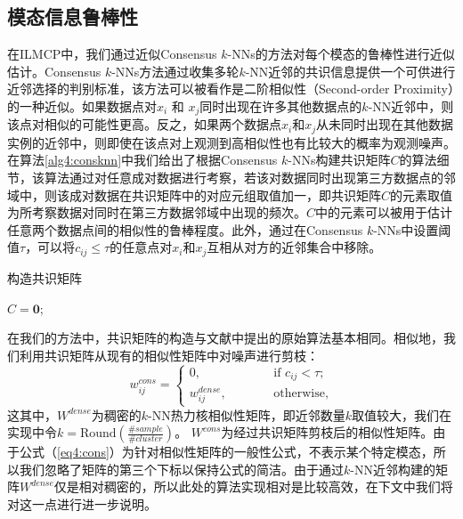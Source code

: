 \subsection{模态信息鲁棒性}
在ILMCP中，我们通过近似Consensus $k$-NNs\cite{premachandran2013consensus}的方法对每个模态的鲁棒性进行近似估计。Consensus $k$-NNs方法通过收集多轮$k$-NN近邻的共识信息提供一个可供进行近邻选择的判别标准，该方法可以被看作是二阶相似性（Second-order Proximity）\cite{tang2015line,wang2016structural}的一种近似。如果数据点对$x_i$ 和 $x_j$同时出现在许多其他数据点的$k$-NN近邻中，则该点对相似的可能性更高。反之，如果两个数据点$x_i$和$x_j$从未同时出现在其他数据实例的近邻中，则即使在该点对上观测到高相似性也有比较大的概率为观测噪声。
在算法\ref{alg4:consknn}中我们给出了根据Consensus $k$-NNs构建共识矩阵$C$的算法细节，该算法通过对任意成对数据进行考察，若该对数据同时出现第三方数据点的邻域中，则该成对数据在共识矩阵中的对应元组取值加一，即共识矩阵$C$的元素取值为所考察数据对同时在第三方数据邻域中出现的频次。$C$中的元素可以被用于估计任意两个数据点间的相似性的鲁棒程度。此外，通过在Consensus $k$-NNs中设置阈值$\tau$，可以将${c}_{ij}\le\tau$的任意点对$x_i$和$x_j$互相从对方的近邻集合中移除。
\begin{algorithm}[tb]
            \caption{构造共识矩阵}
            \label{alg4:consknn}
            ${C} = \mathbf{0}$;
            \For {$i = 1:N$}{
                \ForAll {$x_j, x_k$满足$x_j, x_k \in \mathcal{N}_k(x_i)$}{
                    ${c}_{j,k} = {c}_{j,k}+1$\;
                    ${c}_{k,j} = {c}_{k,j}+1$\;
                }
            }
\end{algorithm}

在我们的方法中，共识矩阵的构造与文献\parencite{premachandran2013consensus}中提出的原始算法基本相同。相似地，我们利用共识矩阵从现有的相似性矩阵中对噪声进行剪枝：
\begin{equation}
{w}^{cons}_{ij} = 
\begin{cases}
0,\quad\qquad\qquad&\text{if }{c}_{ij}<\tau;\\ {w}^{dense}_{ij},&\text{otherwise,}
\end{cases}
\label{eq4:cons}
\end{equation}
这其中，${W}^{dense}$为稠密的$k$-NN热力核相似性矩阵，即近邻数量$k$取值较大，我们在实现中令$k = \mathrm{Round}( \frac{\#sample}{\#cluster})$。 ${W}^{cons}$为经过共识矩阵剪枝后的相似性矩阵。由于公式（\ref{eq4:cons}）为针对相似性矩阵的一般性公式，不表示某个特定模态，所以我们忽略了矩阵的第三个下标以保持公式的简洁。由于通过$k$-NN近邻构建的矩阵${W}^{dense}$仅是相对稠密的，所以此处的算法实现相对是比较高效，在下文中我们将对这一点进行进一步说明。

